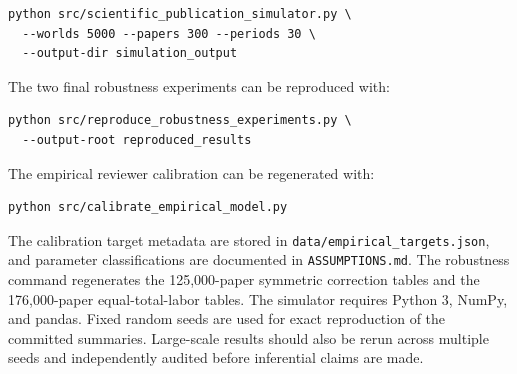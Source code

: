 \begin{verbatim}
python src/scientific_publication_simulator.py \
  --worlds 5000 --papers 300 --periods 30 \
  --output-dir simulation_output
\end{verbatim}

The two final robustness experiments can be reproduced with:

\begin{verbatim}
python src/reproduce_robustness_experiments.py \
  --output-root reproduced_results
\end{verbatim}

The empirical reviewer calibration can be regenerated with:

\begin{verbatim}
python src/calibrate_empirical_model.py
\end{verbatim}

The calibration target metadata are stored in \texttt{data/empirical\_targets.json}, and parameter classifications are documented in \texttt{ASSUMPTIONS.md}. The robustness command regenerates the 125,000-paper symmetric correction tables and the 176,000-paper equal-total-labor tables. The simulator requires Python 3, NumPy, and pandas. Fixed random seeds are used for exact reproduction of the committed summaries. Large-scale results should also be rerun across multiple seeds and independently audited before inferential claims are made.
